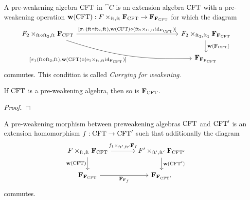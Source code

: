 \begin{defn}
A pre-weakening algebra $\mathrm{CFT}$ in $\cat{C}$ is an extension algebra $\mathrm{CFT}$ 
with a pre-weakening operation 
$ \mathbf{w}(\stesys)
    :
  \cobesys{\stesysf}{\famesys{\stesys}}{\eft}{\eft}
    \to
  \famesys{\famesys{\stesys}}$
for which the diagram
\begin{equation*}
\begin{tikzcd}[column sep=15em]
\cobesys{\stesysf_2}{\famesys{\stesys}}{\eft\circ\eft[2]}{\eft}
  \ar[bend right=10]{dr}[swap]%
    { [ \pullbackpr{1}{\eft\circ\eft[2]}{\eft},%
        \mathbf{w}(\stesys)%
          \circ%
        (\pullback{\efamext}{\catid{\famesys{\stesys}}}{\eft}{\eft})%
        ]%
      }
  \ar{r}{
    [ \pullbackpr{1}{\eft\circ\eft[2]}{\eft},%
      \mathbf{w}(\stesys)%
        \circ%
      (\pullback{\eft[2]}{\catid{\famesys{\stesys}}}{\eft}{\eft})%
      ]}%
  &
\cobesys{\stesysf_2}{\famesys{\famesys{\stesys}}}{\eft[2]}{\eft[2]}
  \ar{d}{\mathbf{w}(\famesys{\stesys})}
  \\
  {}&
\famesys{\famesys{\famesys{\stesys}}}
\end{tikzcd}
\end{equation*}
commutes. This condition is called \emph{Currying for weakening}.
\end{defn}

\begin{lem}
If $\mathrm{CFT}$ is a pre-weakening algebra, then so is $\mathbf{F}_{\mathrm{CFT}}$. 
\end{lem}

\begin{proof}
\end{proof}

\begin{defn}
A pre-weakening morphism between preweakening algebras $\mathrm{CFT}$ and $\mathrm{CFT}'$ is an
extension homomorphism $f:\mathrm{CFT}\to \mathrm{CFT}'$ such that additionally the diagram
\begin{equation*}
\begin{tikzcd}[column sep=large]
\cobesys{\stesysf}{\famesys{\stesys}}{\eft}{\eft}
  \ar{d}[swap]{\mathbf{w}(\stesys)}
  \ar{r}{\pullback{f_1}{\famehom{f}}{\eft'}{\eft'}}
  &
\cobesys{\stesysf'}{\famesys{\stesys'}}{\eft'}{\eft'}
  \ar{d}{\mathbf{w}(\stesys')}
  \\
\famesys{\famesys{\stesys}}
  \ar{r}[swap]{\famehom{\famehom{f}}}
  &
\famesys{\famesys{\stesys'}}
\end{tikzcd}
\end{equation*}
commutes.
\end{defn}

